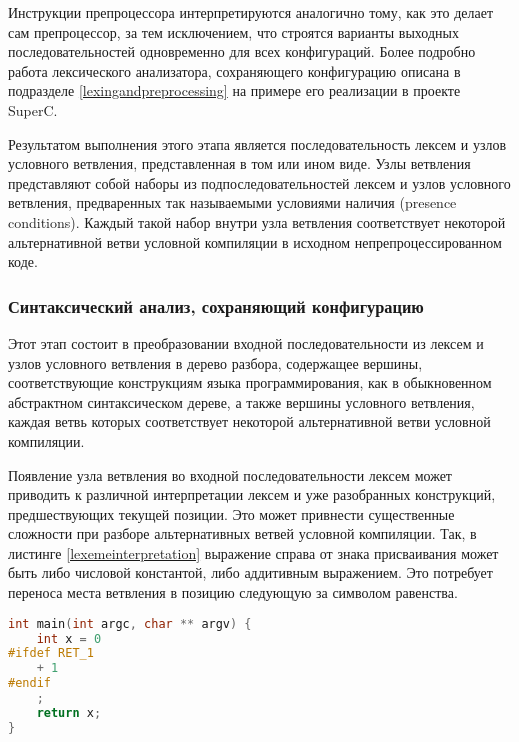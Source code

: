 Инструкции препроцессора интерпретируются аналогично тому, как это делает сам препроцессор, за тем исключением, что строятся варианты выходных последовательностей одновременно для всех конфигураций. Более подробно работа лексического анализатора, сохраняющего конфигурацию описана в подразделе \ref{lexingandpreprocessing} на примере его реализации в проекте SuperC.

Результатом выполнения этого этапа является последовательность лексем и узлов условного ветвления, представленная в том или ином виде. Узлы ветвления представляют собой наборы из подпоследовательностей лексем и узлов условного ветвления, предваренных так называемыми условиями наличия (presence conditions). Каждый такой набор внутри узла ветвления соответствует некоторой альтернативной ветви условной компиляции в исходном непрепроцессированном коде.

\subsubsection{Синтаксический анализ, сохраняющий конфигурацию}

Этот этап состоит в преобразовании входной последовательности из лексем и узлов условного ветвления в дерево разбора, содержащее вершины, соответствующие конструкциям языка программирования, как в обыкновенном абстрактном синтаксическом дереве, а также вершины условного ветвления, каждая ветвь которых соответствует некоторой альтернативной ветви условной компиляции.

Появление узла ветвления во входной последовательности лексем может приводить к различной интерпретации лексем и уже разобранных конструкций, предшествующих текущей позиции. Это может привнести существенные сложности при разборе альтернативных ветвей условной компиляции. Так, в листинге \ref{lexemeinterpretation} выражение справа от знака присваивания может быть либо числовой константой, либо аддитивным выражением. Это потребует переноса места ветвления в позицию следующую за символом равенства.

\begin{minipage}{\linewidth}
\begin{lstlisting}[caption={Пример различной интерпретации лексем, предшестующих блоку условной компиляции},label=lexemeinterpretation,language=C]
int main(int argc, char ** argv) {
	int x = 0
#ifdef RET_1
	+ 1	
#endif
	;
	return x;	
}
\end{lstlisting}
\end{minipage}

